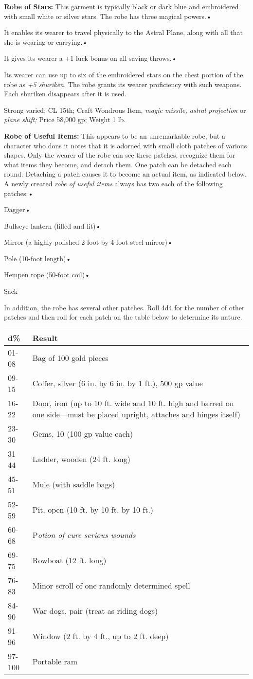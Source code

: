 \documentclass{article}
\begin{document}
\textbf{Robe of Stars:} This garment is typically black or dark blue and embroidered 
with small white or silver stars. The robe has three magical powers.• 

\parindent=3pt
It enables its wearer to travel physically to the Astral Plane, along with all 
that she is wearing or carrying.• 

It gives its wearer a +1 luck bonus on all saving throws.• 

\parindent=7pt
Its wearer can use up to six of the embroidered stars on the chest portion of the 
robe as \textit{+5 shuriken. }The robe grants its wearer proficiency with such 
weapons. Each shuriken disappears after it is used.

\parindent=0pt
Strong varied; CL 15th; Craft Wondrous Item, \textit{magic missile, astral projection 
}or \textit{plane shift; }Price 58,000 gp; Weight 1 lb.

\textbf{Robe of Useful Items:} This appears to be an unremarkable robe, but a character 
who dons it notes that it is adorned with small cloth patches of various shapes. 
Only the wearer of the robe can see these patches, recognize them for what items 
they become, and detach them. One patch can be detached each round. Detaching a 
patch causes it to become an actual item, as indicated below. A newly created \textit{robe 
of useful items }always has two each of the following patches:• 

\parindent=3pt
Dagger• 

Bullseye lantern (filled and lit)• 

\parindent=7pt
Mirror (a highly polished 2-foot-by-4-foot steel mirror)• 

\parindent=3pt
Pole (10-foot length)• 

Hempen rope (50-foot coil)• 

\parindent=7pt
Sack

\parindent=0pt
In addition, the robe has several other patches. Roll 4d4 for the number of other 
patches and then roll for each patch on the table below to determine its nature.

\begin{tabular}{|>{\raggedright}p{24pt}|>{\raggedright}p{302pt}|}
\hline
d\textbf{\%} & R\textbf{esult}\tabularnewline
\hline
01-08 & Bag of 100 gold pieces\tabularnewline
\hline
09-15 & Coffer, silver (6 in. by 6 in. by 1 ft.), 500 gp value\tabularnewline
\hline
16-22 & Door, iron (up to 10 ft. wide and 10 ft. high and barred on one side---must 
be placed upright, attaches and hinges itself)\tabularnewline
\hline
23-30 & Gems, 10 (100 gp value each)\tabularnewline
\hline
31-44 & Ladder, wooden (24 ft. long)\tabularnewline
\hline
45-51 & Mule (with saddle bags)\tabularnewline
\hline
52-59 & Pit, open (10 ft. by 10 ft. by 10 ft.)\tabularnewline
\hline
60-68 & P\textit{otion of cure serious wounds}\tabularnewline
\hline
69-75 & Rowboat (12 ft. long)\tabularnewline
\hline
76-83 & Minor scroll of one randomly determined spell\tabularnewline
\hline
84-90 & War dogs, pair (treat as riding dogs)\tabularnewline
\hline
91-96 & Window (2 ft. by 4 ft., up to 2 ft. deep)\tabularnewline
\hline
97-100 & Portable ram\tabularnewline
\hline
\end{tabular}
\end{document}
